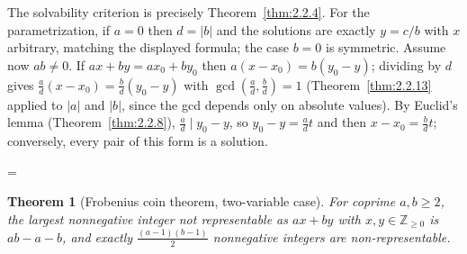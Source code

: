 \documentclass[11pt]{article}
\makeatletter
\theoremstyle{ntstyle}
\newtheorem{theorem}{Theorem}[subsection]
\let\nt@closedisplay\]
\def\nt@guardedclose{\@ifnextchar\par{\nt@closeafterpar}{\@ifnextchar\end{\postdisplaypenalty\@M\nt@closedisplay}{\nt@closedisplay}}}
\def\nt@closeafterpar\par{\@ifnextchar\par{\nt@closeafterpar}{\@ifnextchar\end{\postdisplaypenalty\@M\nt@closedisplay\par}{\nt@closedisplay\par}}}
\renewenvironment{proof}[1][\proofname]{\par
  \pushQED{\qed}\normalfont\topsep\medskipamount\edef\nt@afterproof{\@endparpenalty=\the\@endparpenalty\relax}\@beginparpenalty\@M\@endparpenalty\@M\let\]\nt@guardedclose\trivlist\item[]\textit{#1\@addpunct{.}} \ignorespaces}{\ifvmode\addpenalty\@M\fi\popQED\nt@afterproof\endtrivlist\@endpefalse}
\makeatother
\begin{document}
\begin{proof} The solvability criterion is precisely Theorem~\ref{thm:2.2.4}. For the parametrization, if $a=0$ then $d=|b|$ and the solutions are exactly $y=c/b$ with $x$ arbitrary, matching the displayed formula; the case $b=0$ is symmetric. Assume now $ab\neq0$. If $ax+by=ax_0+by_0$ then $a(x-x_0)=b(y_0-y)$; dividing by $d$ gives $\tfrac{a}{d}(x-x_0)=\tfrac{b}{d}(y_0-y)$ with
	$\gcd(\tfrac{a}{d}, \tfrac{b}{d})=1$
	(Theorem~\ref{thm:2.2.13} applied to $|a|$ and $|b|$, since the gcd depends only on absolute values). By Euclid's lemma (Theorem~\ref{thm:2.2.8}), $\tfrac{a}{d}\mid
		y_0-y$, so $y_0-y=\tfrac{a}{d} t$ and then $x-x_0=\tfrac{b}{d} t$;
	conversely, every pair of this form is a solution.

\end{proof}
\begin{theorem}[Frobenius coin theorem, two-variable case]\label{thm:2.6.2} For coprime $a,b\ge2$, the largest nonnegative integer not
	representable as $ax+by$ with $x,y\in\mathbb{Z}_{\ge0}$ is $ab-a-b$, and
	exactly $\tfrac{(a-1)(b-1)}{2}$ nonnegative integers are non-representable.

\end{theorem}
\end{document}
